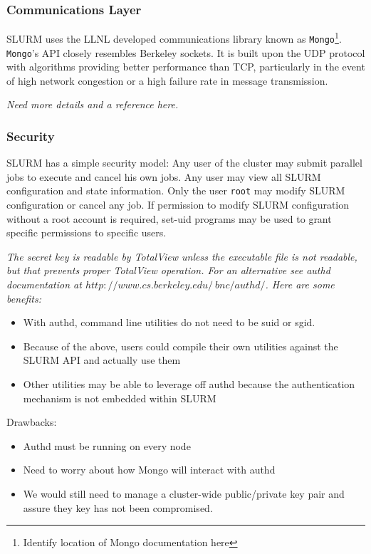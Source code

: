 \subsubsection{Communications Layer}

SLURM uses the LLNL developed communications library known as 
{\tt Mongo}\footnote{Identify location of Mongo documentation here}. 
{\tt Mongo}'s API closely resembles Berkeley sockets. It is built upon the UDP 
protocol with algorithms providing better performance than TCP, particularly 
in the event of high network congestion or a high failure rate in message 
transmission. 

{\em Need more details and a reference here.}

\subsubsection{Security}

SLURM has a simple security model: 
Any user of the cluster may submit parallel jobs to execute and cancel
his own jobs.  Any user may view all SLURM configuration and state
information.  Only the user {\tt root} may modify SLURM configuration or
cancel any job.  If permission to modify SLURM configuration without a
root account is required, set-uid programs may be used to grant specific
permissions to specific users.

{\em The secret key is readable by TotalView unless the executable 
file is not readable, but that prevents proper TotalView operation. 
For an alternative see authd documentation at 
$http://www.cs.berkeley.edu/~bnc/authd/$. Here are some benefits:
\begin{itemize}
\item With authd, command line utilities do not need to be suid or sgid.
\item Because of the above, users could compile their own utilities against 
the SLURM API and actually use them
\item Other utilities may be able to leverage off authd because the authentication 
mechanism is not embedded within SLURM
\end{itemize}
Drawbacks:
\begin{itemize}
\item Authd must be running on every node
\item Need to worry about how Mongo will interact with authd
\item We would still need to manage a cluster-wide public/private key pair 
and assure they key has not been compromised.
\end{itemize}
}

